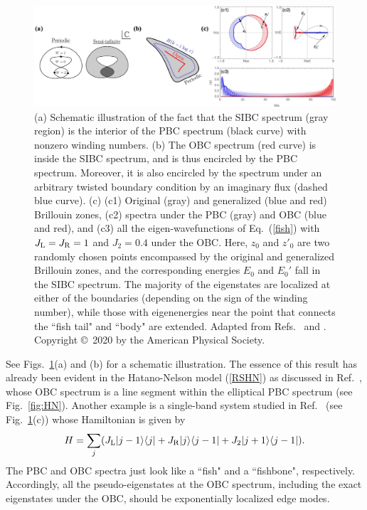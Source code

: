 \documentclass{tADP2e}
\theoremstyle{plain}
\theoremstyle{plain}
\theoremstyle{definition}
\begin{document}
\begin{figure}[!t]
\begin{center}
\includegraphics[width=12cm]{./Figures/fig_5_SKE.pdf}
\end{center}
\caption{(a) Schematic illustration of the fact that the SIBC spectrum (gray region) is the interior of the PBC spectrum (black curve) with nonzero winding numbers. (b) The OBC spectrum (red curve) is inside the SIBC spectrum, and is thus encircled by the PBC spectrum. Moreover, it is also encircled by the spectrum under an arbitrary twisted boundary condition by an imaginary flux (dashed blue curve). (c) (c1) Original (gray) and generalized (blue and red) Brillouin zones, (c2) spectra under the PBC (gray) and OBC (blue and red), and (c3) all the eigen-wavefunctions of Eq.~(\ref{fish}) with $J_{\rm L}=J_{\rm R}=1$ and $J_2=0.4$  under the OBC. Here, $z_0$ and $z'_0$ are two randomly chosen points encompassed by the original and generalized Brillouin zones, and the corresponding energies $E_0$ and $E_0'$ fall in the SIBC spectrum. The majority of the eigenstates are localized at either of the boundaries (depending on the sign of the winding number), while those with eigenenergies near the point that connects the ``fish tail" and ``body" are extended. Adapted from Refs.~\cite{NO20} and \cite{KZ19}. Copyright \copyright\,  2020 by the American Physical Society.}
\label{fig:SKE}
\end{figure}
\noindent See Figs.~\ref{fig:SKE}(a) and (b) for a schematic illustration. The essence of this result has already been evident in the Hatano-Nelson model (\ref{RSHN}) as discussed in Ref.~\cite{ZG18}, whose OBC spectrum is a line segment within the elliptical PBC spectrum (see Fig.~\ref{fig:HN}). Another example is a single-band system studied in Ref.~\cite{KZ19} (see Fig.~\ref{fig:SKE}(c)) whose Hamiltonian is given by
\begin{equation}
H=\sum_j(J_{\rm L}|j-1\rangle\langle j| +J_{\rm R}|j\rangle\langle j-1|+J_2 |j+1\rangle\langle j-1|).
\label{fish}
\end{equation}
The PBC and OBC spectra just look like a ``fish" and a ``fishbone", respectively. Accordingly, all the pseudo-eigenstates at the OBC spectrum, including the exact eigenstates under the OBC, should be exponentially localized edge modes. 
\end{document}
